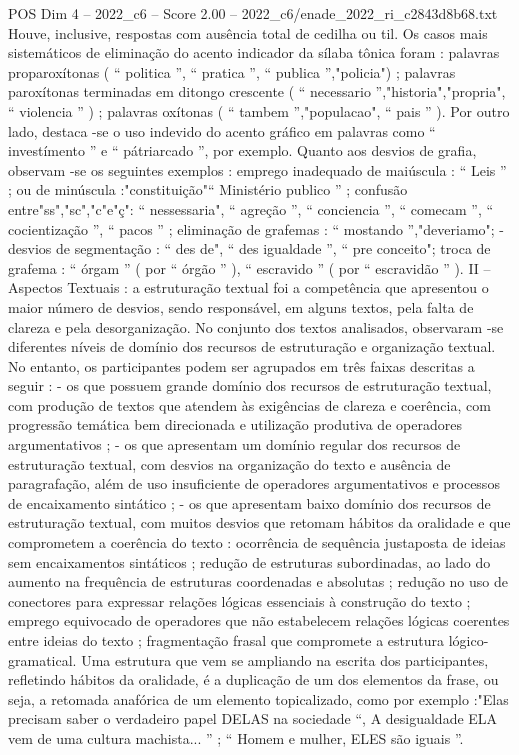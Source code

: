 \begin{textsample}{POS Dim 4 – 2022\_c6 – Score 2.00 – 2022\_c6/enade\_2022\_ri\_c2843d8b68.txt}
Houve, inclusive, respostas com ausência total de cedilha ou til.
Os casos mais sistemáticos de eliminação do acento indicador da sílaba tônica foram : palavras proparoxítonas ( “ politica ”, “ pratica ”, “ publica ”,"policia") ; palavras paroxítonas terminadas em ditongo crescente ( “ necessario ”,"historia","propria", “ violencia ” ) ; palavras oxítonas ( “ tambem ”,"populacao", “ pais ” ).
Por outro lado, destaca -se o uso indevido do acento gráfico em palavras como “ investímento ” e “ pátriarcado ”, por exemplo.
Quanto aos desvios de grafia, observam -se os seguintes exemplos : emprego inadequado de maiúscula : “ Leis ” ; ou de minúscula :"constituição"“ Ministério publico ” ; confusão entre"ss","sc","c"e"ç": “ nessessaria", “ agreção ”, “ conciencia ”, “ comecam ”, “ cocientização ”, “ pacos ” ; eliminação de grafemas : “ mostando ”,"deveriamo"; - desvios de segmentação : “ des de", “ des igualdade ”, “ pre conceito"; troca de grafema : “ órgam ” ( por “ órgão ” ), “ escravido ” ( por “ escravidão ” ).
II – Aspectos Textuais : a estruturação textual foi a competência que apresentou o maior número de desvios, sendo responsável, em alguns textos, pela falta de clareza e pela desorganização.
No conjunto dos textos analisados, observaram -se diferentes níveis de domínio dos recursos de estruturação e organização textual.
No entanto, os participantes podem ser agrupados em três faixas descritas a seguir : - os que possuem grande domínio dos recursos de estruturação textual, com produção de textos que atendem às exigências de clareza e coerência, com progressão temática bem direcionada e utilização produtiva de operadores argumentativos ; - os que apresentam um domínio regular dos recursos de estruturação textual, com desvios na organização do texto e ausência de paragrafação, além de uso insuficiente de operadores argumentativos e processos de encaixamento sintático ; - os que apresentam baixo domínio dos recursos de estruturação textual, com muitos desvios que retomam hábitos da oralidade e que comprometem a coerência do texto : ocorrência de sequência justaposta de ideias sem encaixamentos sintáticos ; redução de estruturas subordinadas, ao lado do aumento na frequência de estruturas coordenadas e absolutas ; redução no uso de conectores para expressar relações lógicas essenciais à construção do texto ; emprego equivocado de operadores que não estabelecem relações lógicas coerentes entre ideias do texto ; fragmentação frasal que compromete a estrutura lógico-gramatical.
Uma estrutura que vem se ampliando na escrita dos participantes, refletindo hábitos da oralidade, é a duplicação de um dos elementos da frase, ou seja, a retomada anafórica de um elemento topicalizado, como por exemplo :"Elas precisam saber o verdadeiro papel DELAS na sociedade “, A desigualdade ELA vem de uma cultura machista... ” ; “ Homem e mulher, ELES são iguais ”.

\end{textsample}
